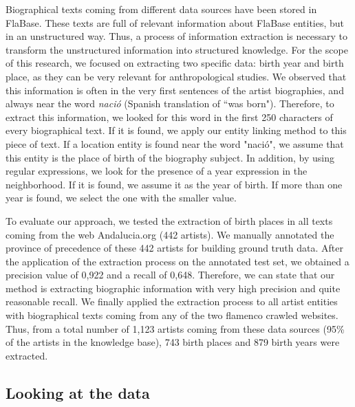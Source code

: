 Biographical texts coming from different data sources have been stored in FlaBase. These texts are full of relevant information about FlaBase entities, but in an unstructured way. Thus, a process of information extraction is necessary to transform the unstructured information into structured knowledge. For the scope of this research, we focused on extracting two specific data: birth year and birth place, as they can be very relevant for anthropological studies. We observed that this information is often in the very first sentences of the artist biographies, and always near the word \textit{naci\'{o}} (Spanish translation of ``was born"). Therefore, to extract this information, we looked for this word in the first 250 characters of every biographical text. If it is found, we apply our entity linking method to this piece of text. If a location entity is found near the word "naci\'{o}", we assume that this entity is the place of birth of the biography subject. In addition, by using regular expressions, we look for the presence of a year expression in the neighborhood. If it is found, we assume it as the year of birth. If more than one year is found, we select the one with the smaller value. 

To evaluate our approach, we tested the extraction of birth places in all texts coming from the web Andalucia.org (442 artists). %
We manually annotated the province of precedence of these 442 artists for building ground truth data. After the application of the extraction process on the annotated test set, we obtained a precision value of 0,922 and a recall of 0,648. Therefore, we can state that our method is extracting biographic information with very high precision and quite reasonable recall. 
We finally applied the extraction process to all artist entities with biographical texts coming from any of the two flamenco crawled websites. Thus, from a total number of 1,123 artists coming from these data sources (95\% of the artists in the knowledge base), 743 birth places and 879 birth years were extracted. 

\subsection{Looking at the data}\label{sec:musicology:statistics}

